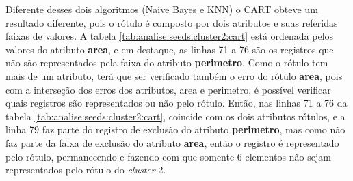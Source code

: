 Diferente desses dois algoritmos (Naive Bayes e KNN) o CART obteve um resultado diferente, pois o rótulo é composto por dois atributos e suas referidas faixas de valores. A tabela \ref{tab:analise:seeds:cluster2:cart} está ordenada pelos valores do atributo \textbf{area}, e em destaque, as linhas 71 a 76 são os registros que não são representados pela faixa do atributo \textbf{perimetro}.  Como o rótulo tem mais de um atributo, terá que ser verificado também o erro do rótulo \textbf{area}, pois com  a interseção dos erros dos atributos, area e perimetro, é possível verificar quais registros são representados ou não pelo rótulo. Então, nas linhas 71 a 76 da tabela \ref{tab:analise:seeds:cluster2:cart}, coincide com os dois atributos rótulos, e a linha 79 faz parte do registro de exclusão do atributo \textbf{perimetro}, mas como não faz parte da faixa de exclusão do atributo \textbf{area}, então o registro é representado pelo rótulo, permanecendo e fazendo com que somente 6 elementos não sejam representados pelo rótulo do \textit{cluster} 2.

% 
% 

